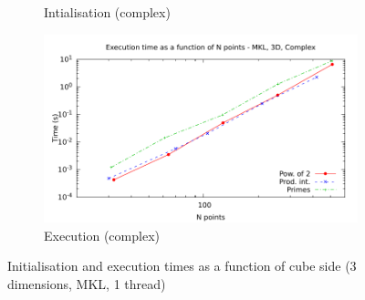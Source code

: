 \documentclass[12pt, a4paper]{article}
\begin{document}
\begin{figure}[H]
\begin{subfigure}{.5\textwidth}
\caption{Intialisation (complex)}
\label{3DMKLCI}
\end{subfigure}%
\begin{subfigure}{.5\textwidth}
\centering
\includegraphics[width=.9\linewidth]{graphs/3d-mkl-exec-c.pdf}
\caption{Execution (complex)}
\label{3DMKLC}
\end{subfigure}
\caption{Initialisation and execution times as a function of cube side (3 dimensions, MKL, 1 thread)}
\label{3DMKL}
\end{figure}
\end{document}
